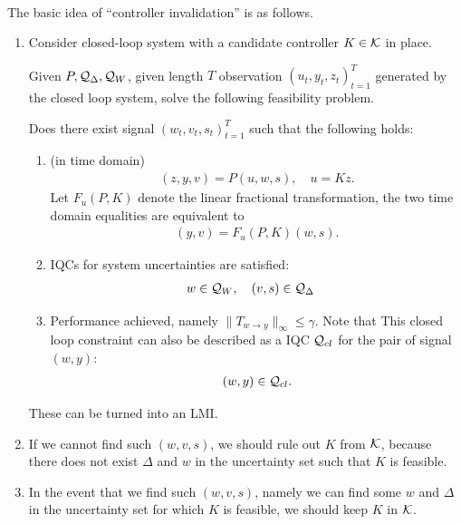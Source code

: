 \documentclass[11pt, onecolumn]{article}
\begin{document}
\paragraph{}
The basic idea of ``controller invalidation'' is as follows.


\begin{enumerate}
\item

Consider closed-loop system with a candidate controller $K\in\mathcal K$ in place.

Given $P, \mathcal Q_{\Delta}, \mathcal Q_{W}$, given length $T$ observation $(u_t, y_t, z_t)_{t=1}^{T}$
generated by the closed loop system, solve the following feasibility problem.

Does there exist signal $(w_t, v_t, s_t)_{t=1}^{T}$ such that the following holds:
\begin{enumerate}
\item {(in time domain)}
  \begin{align*} (z,y,v) = P (u,w,s), \quad u = K z.
  \end{align*}
  Let $F_u(P,K)$ denote the linear fractional transformation, the two time domain equalities are
  equivalent to
  \begin{align*} (y,v) = F_u(P,K) (w,s).
  \end{align*}

\item IQCs for system  uncertainties are satisfied:
  \begin{align*} & w\in\mathcal Q_W, \quad (v,s) \in \mathcal Q_{\Delta}
  \end{align*}

\item Performance achieved, namely $\|T_{w\to y}\|_{\infty} \le \gamma$. Note that This closed loop
  constraint can also be described as a IQC $\mathcal Q_{cl}$ for the pair of signal $(w,y)$:
  \begin{align*}
    (w,y) \in \mathcal Q_{cl}.
  \end{align*}

\end{enumerate}
These can be turned into an LMI.


\item If we cannot find such $(w,v,s)$, we should rule out $K$ from $\mathcal K$, because there does not
  exist $\Delta$ and $w$ in the uncertainty set such that $K$ is feasible.

\item In the event that we find such $(w,v,s)$, namely we can find some $w$ and  $\Delta$ in the
  uncertainty set for which $K$ is feasible, we should keep $K$ in $\mathcal K$.


\end{enumerate}
\end{document}
